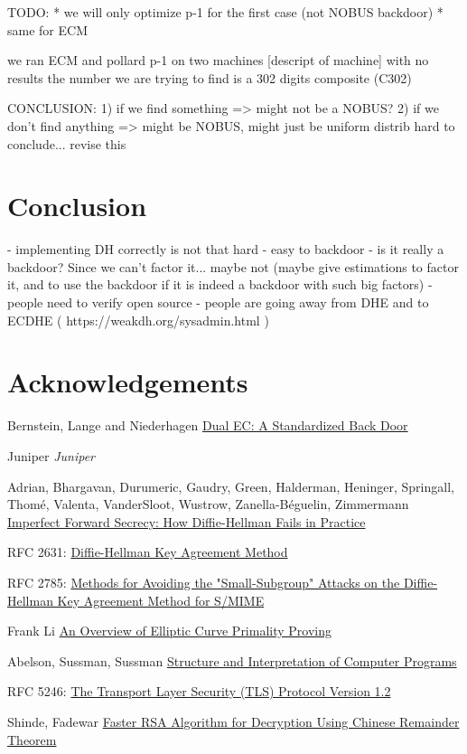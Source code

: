 \documentclass[a4paper,11pt]{article}
\begin{document}
TODO:
* we will only optimize p-1 for the first case (not NOBUS backdoor)
* same for ECM

we ran ECM and pollard p-1 on two machines [descript of machine] with no results
the number we are trying to find is a 302 digits composite (C302)

CONCLUSION:
1) if we find something => might not be a NOBUS?
2) if we don't find anything => might be NOBUS, might just be uniform distrib
hard to conclude... revise this

\section{Conclusion}

- implementing DH correctly is not that hard
- easy to backdoor
- is it really a backdoor? Since we can't factor it... maybe not (maybe give estimations to factor it, and to use the backdoor if it is indeed a backdoor with such big factors)
- people need to verify open source
- people are going away from DHE and to ECDHE ( https://weakdh.org/sysadmin.html )
\newpage

\section*{Acknowledgements}


\newpage

\begin{thebibliography}{1}

 Bernstein, Lange and Niederhagen \href{https://eprint.iacr.org/2015/767.pdf}{Dual EC: A Standardized Back Door}

 Juniper {\em Juniper}

 Adrian, Bhargavan, Durumeric, Gaudry, Green, Halderman, Heninger, Springall, Thomé, Valenta,  VanderSloot, Wustrow, Zanella-Béguelin, Zimmermann \href{https://weakdh.org/imperfect-forward-secrecy-ccs15.pdf}{Imperfect Forward Secrecy: How Diffie-Hellman Fails in Practice}

 RFC 2631: \href{https://tools.ietf.org/html/rfc2631}{Diffie-Hellman Key Agreement Method}

 RFC 2785: \href{https://tools.ietf.org/html/rfc2785}{Methods for Avoiding the "Small-Subgroup" Attacks on the Diffie-Hellman Key Agreement Method for S/MIME}

 Frank Li \href{http://theory.stanford.edu/~dfreeman/cs259c-f11/finalpapers/primalityproving.pdf}{An Overview of Elliptic Curve Primality Proving}

 Abelson, Sussman, Sussman \href{https://mitpress.mit.edu/sicp/chapter1/footnode.html#2413}{Structure and Interpretation of Computer Programs}

 RFC 5246: \href{https://www.ietf.org/rfc/rfc5246.txt}{The Transport Layer Security (TLS) Protocol Version 1.2}

 Shinde, Fadewar \href{http://www.techscience.com/doi/10.3970/icces.2008.005.255.pdf}{Faster RSA Algorithm for Decryption Using Chinese
Remainder Theorem}

\end{thebibliography}
\end{document}
